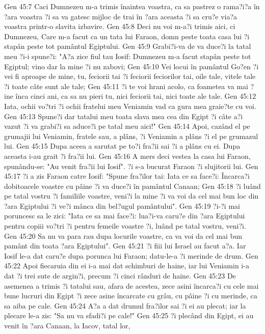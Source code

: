 Gen 45:7  Caci Dumnezeu m-a trimis înaintea voastra, ca sa pastrez o rama?i?a în ?ara voastra ?i sa va gatesc mijloc de trai în ?ara aceasta ?i sa cru?e via?a voastra printr-o slavita izbavire.
Gen 45:8  Deci nu voi m-a?i trimis aici, ci Dumnezeu, Care m-a facut ca un tata lui Faraon, domn peste toata casa lui ?i stapân peste tot pamântul Egiptului.
Gen 45:9  Grabi?i-va de va duce?i la tatal meu ?i-i spune?i: "A?a zice fiul tau Iosif: Dumnezeu m-a facut stapân peste tot Egiptul; vino dar la mine ?i nu zabovi;
Gen 45:10  Vei locui în pamântul Go?en ?i vei fi aproape de mine, tu, feciorii tai ?i feciorii feciorilor tai, oile tale, vitele tale ?i toate câte sunt ale tale;
Gen 45:11  ?i te voi hrani acolo, ca foametea va mai ?ine înca cinci ani, ca sa nu pieri tu, nici feciorii tai, nici toate ale tale.
Gen 45:12  Iata, ochii vo?tri ?i ochii fratelui meu Veniamin vad ca gura mea graie?te cu voi.
Gen 45:13  Spune?i dar tatalui meu toata slava mea cea din Egipt ?i câte a?i vazut ?i va grabi?i sa aduce?i pe tatal meu aici!"
Gen 45:14  Apoi, cazând el pe grumajii lui Veniamin, fratele sau, a plâns, ?i Veniamin a plâns ?i el pe grumazul lui.
Gen 45:15  Dupa aceea a sarutat pe to?i fra?ii sai ?i a plâns cu ei. Dupa aceasta i-au grait ?i fra?ii lui.
Gen 45:16  A mers deci vestea la casa lui Faraon, spunându-se: "Au venit fra?ii lui Iosif". ?i s-a bucurat Faraon ?i slujitorii lui.
Gen 45:17  ?i a zis Faraon catre Iosif: "Spune fra?ilor tai: Iata ce sa face?i: Încarca?i dobitoacele voastre cu pâine ?i va duce?i în pamântul Canaan;
Gen 45:18  ?i luând pe tatal vostru ?i familiile voastre, veni?i la mine ?i va voi da cel mai bun loc din ?ara Egiptului ?i ve?i mânca din bel?ugul pamântului".
Gen 45:19  ?i-?i mai poruncesc sa le zici: "Iata ce sa mai face?i: lua?i-va caru?e din ?ara Egiptului pentru copiii vo?tri ?i pentru femeile voastre ?i, luând pe tatal vostru, veni?i.
Gen 45:20  Sa nu va para rau dupa locurile voastre, ca va voi da cel mai bun pamânt din toata ?ara Egiptului".
Gen 45:21  ?i fiii lui Israel au facut a?a. Iar Iosif le-a dat caru?e dupa porunca lui Faraon; datu-le-a ?i merinde de drum.
Gen 45:22  Apoi fiecaruia din ei i-a mai dat schimburi de haine, iar lui Veniamin i-a dat ?i trei sute de argin?i, precum ?i cinci rânduri de haine.
Gen 45:23  De asemenea a trimis ?i tatalui sau, afara de acestea, zece asini încarca?i cu cele mai bune lucruri din Egipt ?i zece asine încarcate cu grâu, cu pâine ?i cu merinde, ca sa aiba pe cale.
Gen 45:24  A?a a dat drumul fra?ilor sai ?i ei au plecat; iar la plecare le-a zis: "Sa nu va sfadi?i pe cale!"
Gen 45:25  ?i plecând din Egipt, ei au venit în ?ara Canaan, la Iacov, tatal lor,
